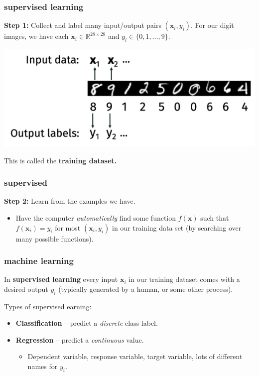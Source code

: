 \documentclass[handout,compress]{beamer}
\newcommand{\bv}[1]{\mathbf{#1}}
\newcommand{\R}{\mathbb{R}}
\begin{document}
\begin{frame}
	\frametitle{supervised learning}
	\textbf{Step 1:}
	Collect and label many input/output pairs $(\bv{x}_i,y_i)$.
	For our digit images, we have each $\bv{x}_i\in \R^{28\times 28}$ and $y_i \in \{0, 1, \ldots, 9\}$. 
	\begin{center}
		\includegraphics[width=.6\textwidth]{collect_data.png}
	\end{center}
	This is called the \textbf{\alert{training dataset.}}
\end{frame}

\begin{frame}
	\frametitle{supervised}
	\textbf{Step 2:} Learn from the examples we have.
	\begin{itemize}
		\item Have the computer \emph{automatically} find some function $f(\bv{x})$ such that $f(\bv{x}_i) = y_i$ \alert{for most $(\bv{x}_i,y_i)$ in our training data set} (by searching over many possible functions).
	\end{itemize}
\end{frame}


\begin{frame}
	\frametitle{machine learning}
	In \textbf{\alert{supervised learning}} every input $\bv{x}_i$ in our training dataset comes with a desired output $y_i$ (typically generated by a human, or some other process).
	
	Types of {supervised earning:}
	\begin{itemize}
		\item \textbf{Classification} -- predict a \emph{discrete} class label.
		\item \textbf{Regression} -- predict a \emph{continuous} value.
		\begin{itemize}
			\item Dependent variable, response variable, target variable, lots of different names for $y_i$.
		\end{itemize}
	\end{itemize}
\end{frame}
\end{document}
